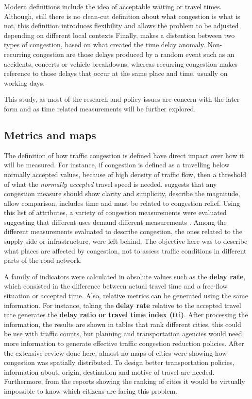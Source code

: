 \documentclass[a4paper]{jpconf}
\begin{document}
	Modern definitions include the idea of acceptable waiting or travel times. Although, still there is no clean-cut definition about what congestion is what is not, this definition introduces flexibility and allows the problem to be adjusted depending on different local contexts \parencite{Downs1992, Falcocchio2015} 
	Finally, \textcite{Stopher2006, Skabardonis2003} makes a distention between two types of congestion, based on what created the time delay anomaly. Non-recurring congestion are those delays produced by a random event such as an accidents, concerts or vehicle breakdowns, whereas recurring congestion makes reference to those delays that occur at the same place and time, usually on working days. \par
	This study, as most of the research and policy issues are concern with the later form and as time related measurements will be further explored.\par
	
	
	\subsection{Metrics and maps}
	The definition of how traffic congestion is defined have direct impact over how it will be measured. For instance, if congestion is defined as a travelling below normally accepted values, because of high density of traffic flow, then a threshold of what the \textit{normally accepted} travel speed is needed. \textcite{Lomax1997} suggests that any congestion measure should show clarity and simplicity, describe the magnitude, allow comparison, includes time and must be related to congestion relief. Using this list of attributes, a variety of congestion measurements were evaluated suggesting that different uses demand different measurements \parencite{Aftabuzzaman2007, Lomax1997}.
	Among the different measurements evaluated to describe congestion, the ones related to the supply side or infrastructure, were left behind. The objective here was to describe what places are affected by congestion, not to assess traffic conditions in different parts of the road network.\par
	A family of indicators were calculated in absolute values such as the \textbf{delay rate}, which consisted in the difference between actual travel time and a free-flow situation or accepted time. Also, relative metrics can be generated using the same information. For instance, taking the \textbf{delay rate} relative to the accepted travel rate generates the \textbf{delay ratio or travel time index (tti)}. After processing the information, the results are shown in tables that rank different cities, this could be use with traffic counts, but planning and transportation agencies would need more information to generate effective traffic congestion reduction policies. After the extensive review done here, almost no maps of cities were showing how congestion was spatially distributed. To design better transportation policies, information about, origin, destination and motive of travel are needed. Furthermore, from the reports showing the ranking of cities it would be virtually impossible to know which citizens are facing this problem. 
	
\end{document}
